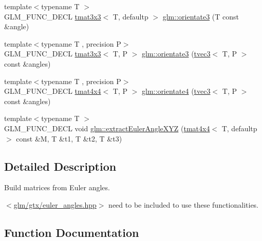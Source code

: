 \begin{DoxyCompactItemize}
{\footnotesize template$<$typename T $>$ }\\G\+L\+M\+\_\+\+F\+U\+N\+C\+\_\+\+D\+E\+CL \hyperlink{structglm_1_1tmat3x3}{tmat3x3}$<$ T, defaultp $>$ \hyperlink{group__gtx__euler__angles_gab188e2526dea3c003e86e298f618085e}{glm\+::orientate3} (T const \&angle)
\item 
{\footnotesize template$<$typename T , precision P$>$ }\\G\+L\+M\+\_\+\+F\+U\+N\+C\+\_\+\+D\+E\+CL \hyperlink{structglm_1_1tmat3x3}{tmat3x3}$<$ T, P $>$ \hyperlink{group__gtx__euler__angles_ga33f0d790cecd8337ee83f8e3a8109b11}{glm\+::orientate3} (\hyperlink{structglm_1_1tvec3}{tvec3}$<$ T, P $>$ const \&angles)
\item 
{\footnotesize template$<$typename T , precision P$>$ }\\G\+L\+M\+\_\+\+F\+U\+N\+C\+\_\+\+D\+E\+CL \hyperlink{structglm_1_1tmat4x4}{tmat4x4}$<$ T, P $>$ \hyperlink{group__gtx__euler__angles_ga4e25c9468b6f002c76e9a2412bcfa503}{glm\+::orientate4} (\hyperlink{structglm_1_1tvec3}{tvec3}$<$ T, P $>$ const \&angles)
\item 
{\footnotesize template$<$typename T $>$ }\\G\+L\+M\+\_\+\+F\+U\+N\+C\+\_\+\+D\+E\+CL void \hyperlink{group__gtx__euler__angles_gad5838a4c87ce2b8ee4c4e17bd162fd14}{glm\+::extract\+Euler\+Angle\+X\+YZ} (\hyperlink{structglm_1_1tmat4x4}{tmat4x4}$<$ T, defaultp $>$ const \&M, T \&t1, T \&t2, T \&t3)
\end{DoxyCompactItemize}


\subsection{Detailed Description}
Build matrices from Euler angles. 

$<$\hyperlink{euler__angles_8hpp}{glm/gtx/euler\+\_\+angles.\+hpp}$>$ need to be included to use these functionalities. 

\subsection{Function Documentation}
\mbox{\label{group__gtx__euler__angles_ga82cd3b8a04943f1a0d1a562aff358dc8}} 

